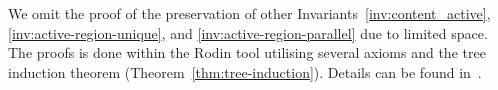 


 


We omit the proof of the preservation of other Invariants~\ref{inv:content_active}, \ref{inv:active-region-unique}, and \ref{inv:active-region-parallel} due to limited space. 
The proofs is done within the Rodin tool utilising several axioms and the tree induction theorem (Theorem~\ref{thm:tree-induction}). 
Details can be found in~\cite{Hoang2023:SCXMLSemanticsModel}.

